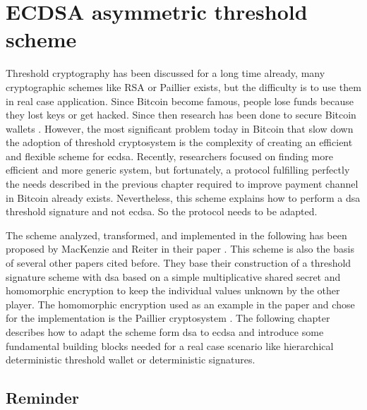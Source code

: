 \chapter{ECDSA asymmetric threshold scheme}
\label{chap:threshold}

Threshold cryptography has been discussed for a long time already, many
cryptographic schemes like RSA or Paillier \cite{10.1007/BFb0052253,
10.1007/978-3-642-27954-6_20} exists, but the difficulty is to use them in real
case application. Since Bitcoin become famous, people lose funds because they
lost keys or get hacked. Since then research has been done to secure Bitcoin
wallets \cite{Goldfeder2015SecuringBW, DBLP:conf/acns/GennaroGN16}. However, the
most significant problem today in Bitcoin that slow down the adoption of
threshold cryptosystem is the complexity of creating an efficient and flexible
scheme for \gls{ecdsa}. Recently, researchers focused on finding more efficient
and more generic system, but fortunately, a protocol fulfilling perfectly the
needs described in the previous chapter required to improve payment channel in
Bitcoin already exists. Nevertheless, this scheme explains how to perform a
\gls{dsa} threshold signature and not \gls{ecdsa}. So the protocol needs to be
adapted.

The scheme analyzed, transformed, and implemented in the following has been
proposed by MacKenzie and Reiter in their paper  \cite{crypto-2001-1592}. This scheme is also the basis of several
other papers cited before. They base their construction of a threshold signature
scheme with \gls{dsa} based on a simple multiplicative shared secret and
homomorphic encryption to keep the individual values unknown by the other
player. The homomorphic encryption used as an example in the paper and chose for
the implementation is the Paillier cryptosystem
\cite{Paillier:1999:PCB:1756123.1756146}. The following chapter describes how to
adapt the scheme form \gls{dsa} to \gls{ecdsa} and introduce some fundamental
building blocks needed for a real case scenario like hierarchical deterministic
threshold wallet or deterministic signatures.

\minitoc

\newpage

\section{Reminder}

